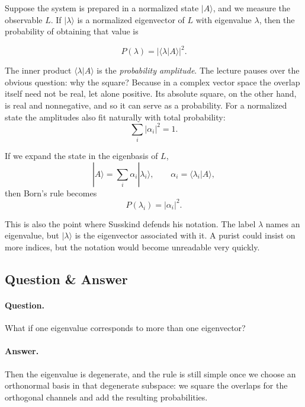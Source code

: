 Suppose the system is prepared in a normalized state \(|A\rangle\), and we measure the observable \(L\). If \(|\lambda\rangle\) is a normalized eigenvector of \(L\) with eigenvalue \(\lambda\), then the probability of obtaining that value is

\begin{equation}
P(\lambda)=|\langle \lambda|A\rangle|^2.
\end{equation}

The inner product \(\langle \lambda|A\rangle\) is the \emph{probability amplitude}. The lecture pauses over the obvious question: why the square? Because in a complex vector space the overlap itself need not be real, let alone positive. Its absolute square, on the other hand, is real and nonnegative, and so it can serve as a probability. For a normalized state the amplitudes also fit naturally with total probability:
\begin{equation}
\sum_i |\alpha_i|^2=1.
\end{equation}

If we expand the state in the eigenbasis of \(L\),
\begin{equation}
|A\rangle=\sum_i \alpha_i |\lambda_i\rangle,
\qquad
\alpha_i=\langle \lambda_i|A\rangle,
\end{equation}
then Born's rule becomes
\begin{equation}
P(\lambda_i)=|\alpha_i|^2.
\end{equation}

This is also the point where Susskind defends his notation. The label \(\lambda\) names an eigenvalue, but \(|\lambda\rangle\) is the eigenvector associated with it. A purist could insist on more indices, but the notation would become unreadable very quickly.

\subsection{Question \& Answer}

\paragraph{Question.} What if one eigenvalue corresponds to more than one eigenvector?

\paragraph{Answer.} Then the eigenvalue is degenerate, and the rule is still simple once we choose an orthonormal basis in that degenerate subspace: we square the overlaps for the orthogonal channels and add the resulting probabilities.

